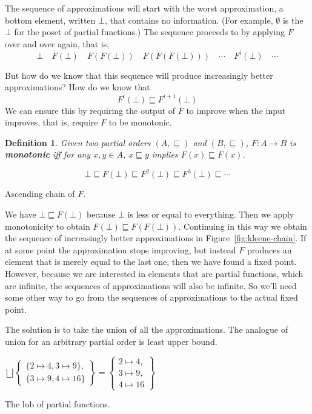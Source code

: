 \documentclass{tufte-handout}
\newtheorem{definition}{Definition}%
\begin{document}
The sequence of approximations will start with the worst
approximation, a bottom element, written $\bot$, that contains no
information. (For example, $\emptyset$ is the $\bot$ for the poset of
partial functions.)
The sequence proceeds to by applying $F$ over and over again, that is,
\[
  \bot \quad F(\bot)\quad F(F(\bot))\quad F(F(F(\bot)))\quad \cdots\quad F^i(\bot)\quad \cdots
\]

But how do we know that this sequence will produce increasingly better
approximations?  How do we know that
\[
F^i(\bot) \sqsubseteq F^{i+1}(\bot)
\]
We can ensure this by requiring the output of $F$ to improve when the
input improves, that is, require $F$ to be monotonic.

\begin{definition}
  Given two partial orders $(A,\sqsubseteq)$ and
  $(B,\sqsubseteq)$, $F : A {\to} B$ is \textbf{\emph{monotonic}} iff
  for any $x,y\in A$, $x \sqsubseteq y$ implies $F(x) \sqsubseteq F(x)$.
\end{definition}

\begin{marginfigure}
\[
  \bot \sqsubseteq F(\bot) \sqsubseteq F^2(\bot) 
    \sqsubseteq F^3(\bot) \sqsubseteq \cdots
\]
\caption{Ascending chain of $F$.}
\label{fig:kleene-chain}
\end{marginfigure}
%
We have $\bot \sqsubseteq F(\bot)$ because $\bot$ is less or equal to
everything. Then we apply monotonicity to obtain $F(\bot) \sqsubseteq
F(F(\bot))$.  Continuing in this way we obtain the sequence of
increasingly better approximations in Figure~\ref{fig:kleene-chain}.
If at some point the approximation stops improving, but instead $F$
produces an element that is merely equal to the last one, then we have
found a fixed point. However, because we are interested in elements
that are partial functions, which are infinite, the sequences of
approximations will also be infinite. So we'll need some other way to
go from the sequences of approximations to the actual fixed point.

The solution is to take the union of all the approximations. The
analogue of union for an arbitrary partial order is least upper bound.

\begin{marginfigure}
$\bigsqcup \left\{\!\! \begin{array}{l}
              \{ 2 \mapsto 4, 3 \mapsto 9 \}, \\
              \{ 3 \mapsto 9, 4 \mapsto 16 \} 
                 \end{array}\!\! \right\}
= \left\{\!\! \begin{array}{l}
        2 \mapsto 4, \\ 3 \mapsto 9, \\ 4 \mapsto 16 
    \end{array}\!\! \right\}$
\caption{The lub of partial functions.}
\end{marginfigure}
\end{document}
